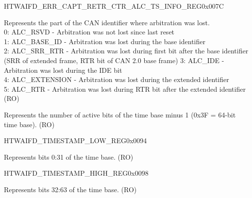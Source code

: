 \begin{register}{H}{TWAIFD\_ERR\_CAPT\_RETR\_CTR\_ALC\_TS\_INFO\_REG}{0x007C}
\begin{regdesc}
\begin{reglist}
\label{fielddesc:TWAIFDALCIDFIELD}\item [TWAIFD\_ALC\_ID\_FIELD] Represents the part of the CAN identifier where arbitration was lost.\\
0: ALC\_RSVD - Arbitration was not lost since last reset\\
1: ALC\_BASE\_ID - Arbitration was lost during the base identifier\\
2: ALC\_SRR\_RTR - Arbitration was lost during first bit after the base identifier (SRR of extended frame, RTR bit of CAN 2.0 base frame)
3: ALC\_IDE - Arbitration was lost during the IDE bit\\
4: ALC\_EXTENSION - Arbitration was lost during the extended identifier\\
5: ALC\_RTR - Arbitration was lost during RTR bit after the extended identifier\\(RO)
\label{fielddesc:TWAIFDTSBITS}\item [TWAIFD\_TS\_BITS] Represents the number of active bits of the time base minus 1 (0x3F = 64-bit time base). (RO)
\end{reglist}\end{regdesc}
\end{register}



\begin{register}{H}{TWAIFD\_TIMESTAMP\_LOW\_REG}{0x0094}\label{regdesc:TWAIFDTIMESTAMPLOWREG}
%
\regnewline%
\begin{regdesc}\begin{reglist}
\label{fielddesc:TWAIFDTIMESTAMPLOW}\item [TWAIFD\_TIMESTAMP\_LOW] Represents bits 0:31 of the time base. (RO)
\end{reglist}\end{regdesc}
\end{register}


\begin{register}{H}{TWAIFD\_TIMESTAMP\_HIGH\_REG}{0x0098}\label{regdesc:TWAIFDTIMESTAMPHIGHREG}
%
\regnewline%
\begin{regdesc}\begin{reglist}
\label{fielddesc:TWAIFDTIMESTAMPHIGH}\item [TWAIFD\_TIMESTAMP\_HIGH] Represents bits 32:63 of the time base. (RO)
\end{reglist}\end{regdesc}
\end{register}


